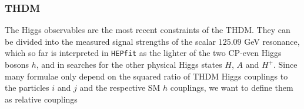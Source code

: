 \documentclass[preprint,3p,12pt]{elsarticle}
\newcommand{\HEPfit}{\texttt{HEPfit}\xspace}
\begin{document}
{%






\subsubsection{THDM}

The Higgs observables are the most recent constraints of the THDM. They can be divided into the measured signal strengths of the scalar $125.09$ GeV resonance, which so far is interpreted in \HEPfit as the lighter of the two CP-even Higgs bosons $h$, and in searches for the other physical Higgs states $H$, $A$ and $H^+$. Since many formulae only depend on the squared ratio of THDM Higgs couplings to the particles $i$ and $j$ and the respective SM $h$ couplings, we want to define them as relative couplings

}
\end{document}
